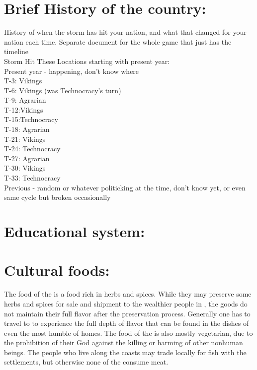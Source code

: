 \documentclass[blue]{GL2020}
\begin{document}
\section{Brief History of the country:}

History of when the storm has hit your nation, and what that changed for your nation each time.
Separate document for the whole game that just has the timeline\\

Storm Hit These Locations starting with present year:\\
Present year - happening, don’t know where\\
T-3: Vikings\\
T-6: Vikings (was Technocracy’s turn)\\
T-9: Agrarian\\
T-12:Vikings\\
T-15:Technocracy\\
T-18: Agrarian\\
T-21: Vikings\\
T-24: Technocracy\\
T-27: Agrarian\\
T-30: Vikings\\
T-33: Technocracy\\
Previous - random or whatever politicking at the time, don’t know yet, or even same cycle but broken occasionally\\

\section{Educational system:}

\section{Cultural foods:}

The food of the \pSunCh{} is a food rich in herbs and spices.  While they may preserve some herbs and spices for sale and shipment to the wealthier people in \pCreators{}, the goods do not maintain their full flavor after the preservation process.  Generally one has to travel to \pSun{} to experience the full depth of flavor that can be found in the dishes of even the most humble of homes.  The food of the \pSunCh{} is also mostly vegetarian, due to the prohibition of their God against the killing or harming of other nonhuman beings.  The people who live along the coasts may trade locally for fish with the \pVikings{} settlements, but otherwise none of the \pSunCh{} consume meat.\\
\end{document}

